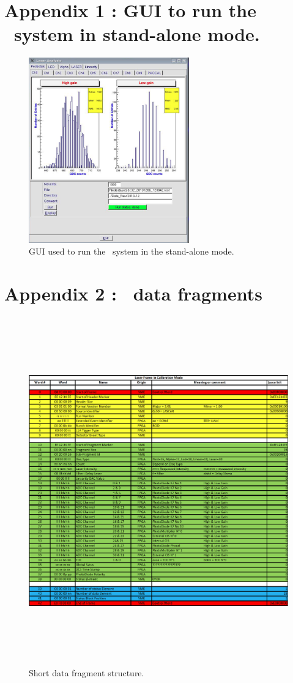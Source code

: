 
\part*{Appendix 1 : GUI to run the \lasii~system in stand-alone mode.}
\label{app:a}
\begin{figure}[htbp]
\centering
\includegraphics[height=8cm]{figures/Stand_alone_GUI}
\caption{GUI used to run the \lasii~system in the stand-alone mode.}\label{fig:lasstandgui}
\end{figure}

\newpage

\part*{Appendix 2 : \lasii~data fragments}
\label{app:b}

\begin{figure}[htbp]
\centering
\includegraphics[height=15cm]{figures/short_fragment.pdf}
\caption{Short data fragment structure.}\label{fig:shortfrag}
\end{figure}

